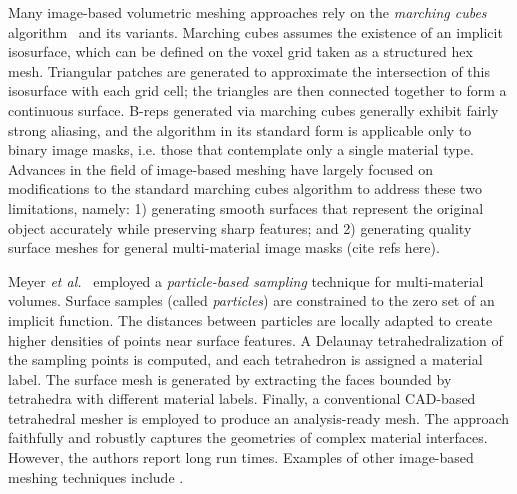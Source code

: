Many image-based volumetric meshing approaches rely on the \textit{marching cubes} algorithm~\cite{lorensen_1987} and its variants. Marching cubes assumes the existence of an implicit isosurface, which can be defined on the voxel grid taken as a structured hex mesh.  Triangular patches are generated to approximate the intersection of this isosurface with each grid cell; the triangles are then connected together to form a continuous surface. B-reps generated via marching cubes generally exhibit fairly strong aliasing, and the algorithm in its standard form is applicable only to binary image masks, i.e. those that contemplate only a single material type.  Advances in the field of image-based meshing have largely focused on modifications to the standard marching cubes algorithm to address these two limitations, namely: 1) generating smooth surfaces that represent the original object accurately while preserving sharp features; and 2) generating quality surface meshes for general multi-material image masks (cite refs here).

Meyer \textit{et al.}~\cite{meyer_2008} employed a \textit{particle-based sampling} technique for multi-material volumes. Surface samples (called \textit{particles}) are constrained to the zero set of an implicit function. The distances between particles are locally adapted to create higher densities of points near surface features. A Delaunay tetrahedralization of the sampling points is computed, and each tetrahedron is assigned a material label. The surface mesh is generated by extracting the faces bounded by tetrahedra with different material labels. Finally, a conventional CAD-based tetrahedral mesher is employed to produce an analysis-ready mesh. The approach faithfully and robustly captures the geometries of complex material interfaces. However, the authors report long run times.
Examples of other image-based meshing techniques include \cite{fang_2009, mohamed_2004, jermyn_2013, boissonnat_2009}. 

